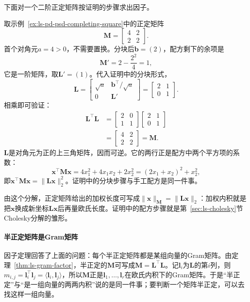下面对一个二阶正定矩阵按证明的步骤求出因子。
\begin{example}[二阶正定矩阵的配方因子]
\label{ex:ls-gram-factor-two-by-two}
取示例~\ref{ex:ls-pd-psd-completing-square}中的正定矩阵
\[
 \bm M=\begin{bmatrix}4&2\\2&2\end{bmatrix}.
\]
首个对角元$a=4>0$，不需要置换。分块后$\bm b=(2)$，配方剩下的余项是
\[
 \bm M'=2-\frac{2^2}{4}=1,
\]
它是一阶矩阵，取$\bm L'=(1)$。代入证明中的分块形式，
\[
 \bm L=\begin{bmatrix}\sqrt a&\bm b^\top/\sqrt a\\ 0&\bm L'\end{bmatrix}=\begin{bmatrix}2&1\\0&1\end{bmatrix}.
\]
相乘即可验证：
\[
 \begin{aligned}
 \bm L^\top\bm L
 &=\begin{bmatrix}2&0\\1&1\end{bmatrix}\begin{bmatrix}2&1\\0&1\end{bmatrix}\\
 &=\begin{bmatrix}4&2\\2&2\end{bmatrix}=\bm M.
 \end{aligned}
\]
$\bm L$是对角元为正的上三角矩阵，因而可逆。它的两行正是配方中两个平方项的系数：
\[
 \bm x^\top\bm M\bm x=4x_1^2+4x_1x_2+2x_2^2=(2x_1+x_2)^2+x_2^2 ,
\]
即$\bm x^\top\bm M\bm x=\lVert\bm L\bm x\rVert_2^2$。证明中的分块步骤与手工配方是同一件事。
\end{example}
由这个分解，正定矩阵给出的加权长度可写成$\lVert\bm x\rVert_{\bm M}=\lVert\bm L\bm x\rVert_2$：加权内积就是把$\bm x$换成新坐标$\bm L\bm x$后再量欧氏长度。证明中的配方步骤就是第~\ref{sec:ls-cholesky}节Cholesky分解的雏形。

\paragraph{半正定矩阵是Gram矩阵}
因子定理回答了上面的问题：每个半正定矩阵都是某组向量的Gram矩阵。由定理~\ref{thm:ls-gram-factor}，半正定的$\bm M$可写成$\bm M=\bm L^\top\bm L$。记$\bm l_i$为$\bm L$的第$i$列，则$m_{i,j}=\bm l_i^\top\bm l_j=\langle\bm l_i,\bm l_j\rangle$，所以$\bm M$正是$\bm l_1,\ldots,\bm l_r$在欧氏内积下的Gram矩阵。于是“半正定”与“是一组向量的两两内积”说的是同一件事；要判断一个矩阵半正定，可以去找这样一组向量。

